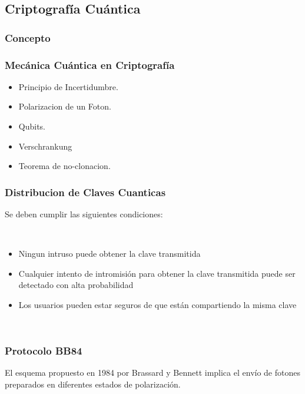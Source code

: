 \documentclass[11pt, conference]{IEEEtran}
\begin{document}
\bigskip\bigskip\bigskip\bigskip\bigskip

\pagebreak
\subsection{\bf Criptografía Cuántica}
\subsubsection{Concepto}
\subsubsection{Mecánica Cuántica en Criptografía}
\begin{itemize}
	\item Principio de Incertidumbre. 
	\item Polarizacion de un Foton.
	\item Qubits.\cite{Papa05}	
	\item Verschrankung
	\item Teorema de no-clonacion.
\end{itemize} \cite{i}\cite{j}\cite{Papa01}

\subsubsection{Distribucion de Claves Cuanticas}
\cite{Papa06}Se deben cumplir las siguientes condiciones:

\

\begin{itemize}
	\item Ningun intruso puede obtener la clave transmitida 
	\item Cualquier intento de intromisión para obtener la clave transmitida puede ser detectado con alta probabilidad
	\item Los usuarios pueden estar seguros de que están compartiendo la misma clave
\end{itemize}

\

\subsubsection{Protocolo BB84}
El esquema propuesto en 1984 por Brassard y Bennett implica el envío de fotones preparados en diferentes estados de polarización.\cite{Papa02}\cite{Papa09}
\end{document}
